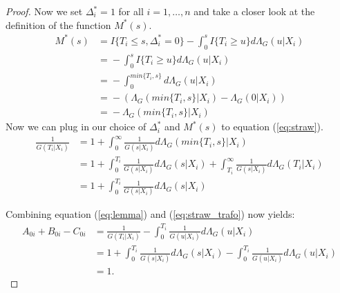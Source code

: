 \documentclass[12pt, a4paper]{scrartcl}
\theoremstyle{definition}
\theoremstyle{plain}
\numberwithin{equation}{section}
\numberwithin{figure}{section}
\numberwithin{table}{section}
\begin{document}
\begin{appendices}
\begin{proof}
			Now we set $ \Delta^*_i=1$ for all $i=1,\dots,n$ and take a closer look at the definition of the function $M^*(s)$.
			\begin{equation*}
			\begin{split}
			M^*(s) &={} I\{T_i \leq s, \Delta^*_i = 0\} - \int_{0}^s I\{T_i\geq u\}d\Lambda_G(u\vert X_i)\\
			& ={} - \int_{0}^s I\{T_i\geq u\}d\Lambda_G(u\vert X_i)\\
			& ={} - \int_0^{min\{T_i,s\}}d\Lambda_G(u\vert X_i)\\
			& ={} - \left(\Lambda_G(min\{T_i,s\}\vert X_i)-\Lambda_G(0\vert X_i)\right)\\
			& ={} - \Lambda_G(min\{T_i,s\}\vert X_i)
			\end{split}
			\end{equation*}
			Now we can plug in our choice of $\Delta^*_i$ and $M^*(s)$ to equation (\ref{eq:straw}).
			\begin{equation}\label{eq:straw_trafo}
			\begin{split}
			\frac{1}{G(T_i\vert X_i)} &={} 1 + \int_{0}^{\infty} \frac{1}{G(s\vert X_i)} d\Lambda_G(min\{T_i,s\}\vert X_i)\\
			&={} 1 + \int_{0}^{T_i} \frac{1}{G(s\vert X_i)} d\Lambda_G(s\vert X_i) + \int_{T_i}^{\infty} \frac{1}{G(s\vert X_i)} d\Lambda_G(T_i\vert X_i)\\
			& ={} 1 + \int_{0}^{T_i} \frac{1}{G(s\vert X_i)} d\Lambda_G(s\vert X_i)
			\end{split}
			\end{equation}
		
			Combining equation (\ref{eq:lemma}) and (\ref{eq:straw_trafo}) now yields:
			\begin{equation*}
			\begin{split}
			A_{0i}+B_{0i}-C_{0i}&={}\frac{1}{G(T_i \vert X_i)} - \int_{0}^{T_i}\frac{1}{G(u\vert X_i)}d\Lambda_G(u\vert X_i)\\
			&={} 1 + \int_{0}^{T_i} \frac{1}{G(s\vert X_i)} d\Lambda_G(s\vert X_i)  - \int_{0}^{T_i}\frac{1}{G(u\vert X_i)}d\Lambda_G(u\vert X_i)\\
			&={} 1.
			\end{split}
			\end{equation*}
		\end{proof}
	
		
		
	\end{appendices}
	
\end{document}
